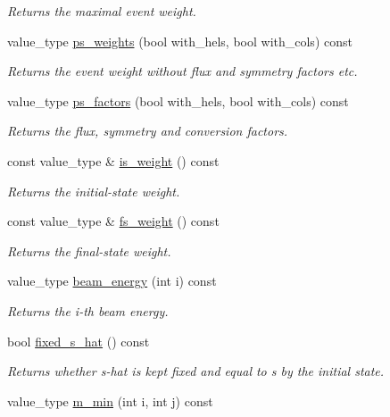\begin{DoxyCompactItemize}
\begin{DoxyCompactList}\small\item\em Returns the maximal event weight. \end{DoxyCompactList}\item 
value\-\_\-type \hyperlink{a00441_a6021d938f5d5a1d6e9d75c50a103da6c}{ps\-\_\-weights} (bool with\-\_\-hels, bool with\-\_\-cols) const 
\begin{DoxyCompactList}\small\item\em Returns the event weight without flux and symmetry factors etc. \end{DoxyCompactList}\item 
value\-\_\-type \hyperlink{a00441_a3df10808826029ddf5b92e9bc1d83004}{ps\-\_\-factors} (bool with\-\_\-hels, bool with\-\_\-cols) const 
\begin{DoxyCompactList}\small\item\em Returns the flux, symmetry and conversion factors. \end{DoxyCompactList}\item 
\hypertarget{a00441_a03d3bfe27e39d60c830d3673b067c904}{const value\-\_\-type \& \hyperlink{a00441_a03d3bfe27e39d60c830d3673b067c904}{is\-\_\-weight} () const }\label{a00441_a03d3bfe27e39d60c830d3673b067c904}

\begin{DoxyCompactList}\small\item\em Returns the initial-\/state weight. \end{DoxyCompactList}\item 
\hypertarget{a00441_a3deb84c93dfe91660dad8500204cd61d}{const value\-\_\-type \& \hyperlink{a00441_a3deb84c93dfe91660dad8500204cd61d}{fs\-\_\-weight} () const }\label{a00441_a3deb84c93dfe91660dad8500204cd61d}

\begin{DoxyCompactList}\small\item\em Returns the final-\/state weight. \end{DoxyCompactList}\item 
\hypertarget{a00441_a31b352c61bdd00a65bfbc541bd14d142}{value\-\_\-type \hyperlink{a00441_a31b352c61bdd00a65bfbc541bd14d142}{beam\-\_\-energy} (int i) const }\label{a00441_a31b352c61bdd00a65bfbc541bd14d142}

\begin{DoxyCompactList}\small\item\em Returns the i-\/th beam energy. \end{DoxyCompactList}\item 
bool \hyperlink{a00441_a4f9919668827c6de2cf110abdf7a7301}{fixed\-\_\-s\-\_\-hat} () const 
\begin{DoxyCompactList}\small\item\em Returns whether s-\/hat is kept fixed and equal to s by the initial state. \end{DoxyCompactList}\item 
\hypertarget{a00441_ab974219877f95adf4f0dbeb9dbb3615e}{value\-\_\-type \hyperlink{a00441_ab974219877f95adf4f0dbeb9dbb3615e}{m\-\_\-min} (int i, int j) const }\label{a00441_ab974219877f95adf4f0dbeb9dbb3615e}


\end{DoxyCompactItemize}
